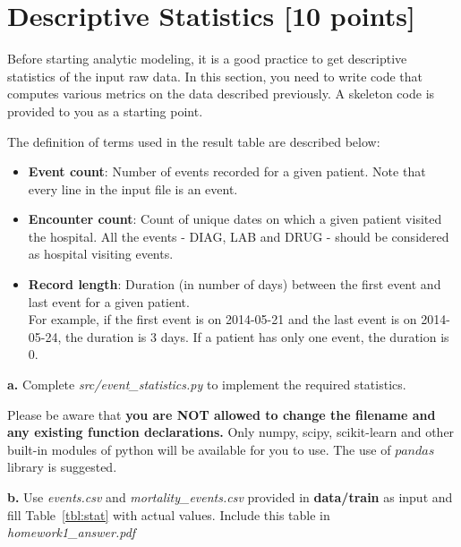\documentclass[12pt]{article}
\begin{document}
 \section{Descriptive Statistics [10 points]}
Before starting analytic modeling, it is a good practice to get descriptive statistics of the input raw data. In this section, you need to write code that computes various metrics on the data described previously. A skeleton code is provided to you as a starting point.

The definition of terms used in the result table are described below:
\begin{itemize}
\item \textbf{Event count}: Number of events recorded for a given patient. Note that every line in the input file is an event. 
\item \textbf{Encounter count}: Count of unique dates on which a given patient visited the hospital. All the events - DIAG, LAB and DRUG - should be considered as hospital visiting events.
\item \textbf{Record length}: Duration (in number of days) between the first event and last event for a given patient. \\
For example, if the first event is on 2014-05-21 and the last event is on 2014-05-24, the duration is 3 days. If a patient has only one event, the duration is 0.
\end{itemize}

\textbf{a.} Complete \textit{src/event\_statistics.py} to implement the required statistics.

Please be aware that \textbf{\color{red} you are NOT allowed to change the filename and any existing function declarations.} Only numpy, scipy, scikit-learn and other built-in modules of python will be available for you to use. The use of $pandas$ library is suggested. 

\textbf{b.} Use \textit{events.csv} and \textit{mortality\_events.csv} provided in \textbf{data/train} as input and fill Table~\ref{tbl:stat} with actual values. Include this table in \textit{homework1\_answer.pdf}\\
\end{document}
